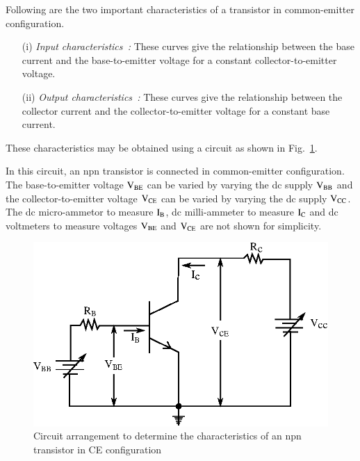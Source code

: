  Following are the two important characteristics of a transistor in common-emitter configuration.
\begin{itemize}
\item[(i)] {\em Input characteristics~:} These curves give the relationship between the base current and the base-to-emitter voltage for a constant collector-to-emitter voltage.

\item[(ii)] {\em Output characteristics~:} These curves give the relationship between the collector current and the collector-to-emitter voltage for a constant base current.
\end{itemize}

These characteristics may be obtained using a circuit as shown in Fig.~\ref{fig2.14}.

\smallskip
In this circuit, an npn transistor is connected in common-emitter configuration. The base-to-emitter voltage $\textrm{V}_{\text{BE}}$ can be varied by varying the dc supply $\textrm{V}_{\text{BB}}$ and the collector-to-emitter voltage $\textrm{V}_{\text{CE}}$ can be varied by varying the dc supply $\textrm{V}_{\text{CC}}$. The dc micro-ammetor to measure $\textrm{I}_{\textrm{B}}$, dc milli-ammeter to measure $\textrm{I}_{\textrm{C}}$ and dc voltmeters to measure voltages $\textrm{V}_{\text{BE}}$ and $\textrm{V}_{\text{CE}}$ are not shown for simplicity.
\begin{figure}[H]
\centering
\includegraphics{chap2/fig14.eps}
\smallskip
\caption{Circuit arrangement to determine the characteristics of an npn transistor in CE configuration}\label{fig2.14}
\end{figure}

